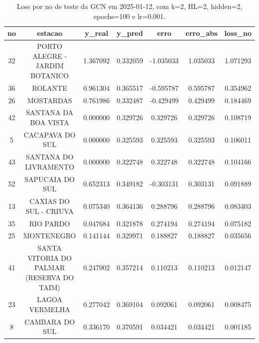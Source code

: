 \begin{table}[h]
\centering
\caption{Loss por no de teste da GCN em 2025-01-12, com k=2, HL=2, hidden=2, epochs=100 e lr=0.001.}
\label{tab:gcn_loss_k2_hl2_h2_e100_d20250112}
\begin{tabular}{ccccccc}
\toprule
no & estacao & y\_real & y\_pred & erro & erro\_abs & loss\_no \\
\midrule
32 & PORTO ALEGRE - JARDIM BOTANICO & 1.367092 & 0.332059 & -1.035033 & 1.035033 & 1.071293 \\
36 & ROLANTE & 0.961304 & 0.365517 & -0.595787 & 0.595787 & 0.354962 \\
26 & MOSTARDAS & 0.761986 & 0.332487 & -0.429499 & 0.429499 & 0.184469 \\
42 & SANTANA DA BOA VISTA & 0.000000 & 0.329726 & 0.329726 & 0.329726 & 0.108719 \\
5 & CACAPAVA DO SUL & 0.000000 & 0.325593 & 0.325593 & 0.325593 & 0.106011 \\
43 & SANTANA DO LIVRAMENTO & 0.000000 & 0.322748 & 0.322748 & 0.322748 & 0.104166 \\
52 & SAPUCAIA DO SUL & 0.652313 & 0.349182 & -0.303131 & 0.303131 & 0.091889 \\
13 & CAXIAS DO SUL - CRIUVA & 0.075340 & 0.364136 & 0.288796 & 0.288796 & 0.083403 \\
35 & RIO PARDO & 0.047684 & 0.321878 & 0.274194 & 0.274194 & 0.075182 \\
25 & MONTENEGRO & 0.141144 & 0.329971 & 0.188827 & 0.188827 & 0.035656 \\
41 & SANTA VITORIA DO PALMAR (RESERVA DO TAIM) & 0.247002 & 0.357214 & 0.110213 & 0.110213 & 0.012147 \\
23 & LAGOA VERMELHA & 0.277042 & 0.369104 & 0.092061 & 0.092061 & 0.008475 \\
8 & CAMBARA DO SUL & 0.336170 & 0.370591 & 0.034421 & 0.034421 & 0.001185 \\
\bottomrule
\end{tabular}
\end{table}
